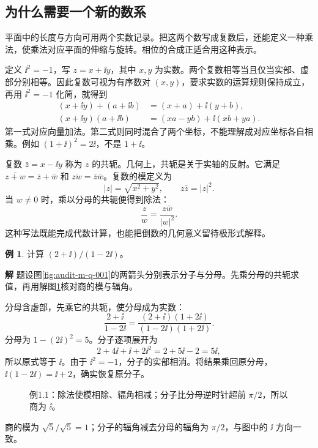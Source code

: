 \documentclass[11pt,openany,fontset=fandol]{ctexbook}
\theoremstyle{plain}\newtheorem{theorem}{定理}[chapter]\newtheorem{proposition}[theorem]{命题}
\theoremstyle{definition}\newtheorem{definition}{定义}[chapter]\newtheorem{example}{例}[chapter]
\theoremstyle{remark}\newtheorem*{remark}{说明}
\newcommand{\SolutionStart}{\par\nobreak\medskip\nobreak\noindent\textbf{解}\quad\ignorespaces}
\newenvironment{solution}{\SolutionStart}{\par\medskip}
\begin{document}
\subsection{为什么需要一个新的数系}
平面中的长度与方向可用两个实数记录。把这两个数写成复数后，还能定义一种乘法，使乘法对应平面的伸缩与旋转。相位的合成正适合用这种表示。

定义 $\ii^2=-1$，写 $z=x+\ii y$，其中 $x,y$ 为实数。两个复数相等当且仅当实部、虚部分别相等。因此复数可视为有序数对 $(x,y)$，要求实数的运算规则保持成立，再用 $\ii^2=-1$ 化简，就得到
\begin{align}
(x+\ii y)+(a+\ii b)&=(x+a)+\ii(y+b),\\
(x+\ii y)(a+\ii b)&=(xa-yb)+\ii(xb+ya).
\end{align}
第一式对应向量加法。第二式则同时混合了两个坐标，不能理解成对应坐标各自相乘。例如 $(1+\ii)^2=2\ii$，不是 $1+\ii$。

复数 $\bar z=x-\ii y$ 称为 $z$ 的共轭。几何上，共轭是关于实轴的反射。它满足 $\overline{z+w}=\bar z+\bar w$ 和 $\overline{zw}=\bar z\bar w$。复数的模定义为
\begin{equation}
|z|=\sqrt{x^2+y^2},\qquad z\bar z=|z|^2.
\end{equation}
当 $w\ne0$ 时，乘以分母的共轭便得到除法：
\begin{equation}
\frac zw=\frac{z\bar w}{|w|^2}.
\end{equation}
这种写法既能完成代数计算，也能把倒数的几何意义留待极形式解释。

\begin{example}
计算 $(2+\ii)/(1-2\ii)$。
\end{example}

\begin{solution}
题设图\ref{fig:audit-m-q-001}的两箭头分别表示分子与分母。先乘分母的共轭求值，再用解图\ref{fig:eg-1-1}核对商的模与辐角。

分母含虚部，先乘它的共轭，使分母成为实数：
\[
\frac{2+\ii}{1-2\ii}=
\frac{(2+\ii)(1+2\ii)}{(1-2\ii)(1+2\ii)}.
\]
分母为 $1-(2\ii)^2=5$。分子逐项展开为
\[
2+4\ii+\ii+2\ii^2=2+5\ii-2=5\ii,
\]
所以原式等于 $\ii$。由于 $\ii^2=-1$，分子的实部相消。将结果乘回原分母，$\ii(1-2\ii)=\ii+2$，确实恢复原分子。

\begin{figure}[H]\centering
{}
\caption{例1.1：除法使模相除、辐角相减；分子比分母逆时针超前 $\pi/2$，所以商为 $\ii$。}\label{fig:eg-1-1}
\end{figure}

商的模为 $\sqrt5/\sqrt5=1$；分子的辐角减去分母的辐角为 $\pi/2$，与图中的 $\ii$ 方向一致。
\end{solution}
\end{document}
